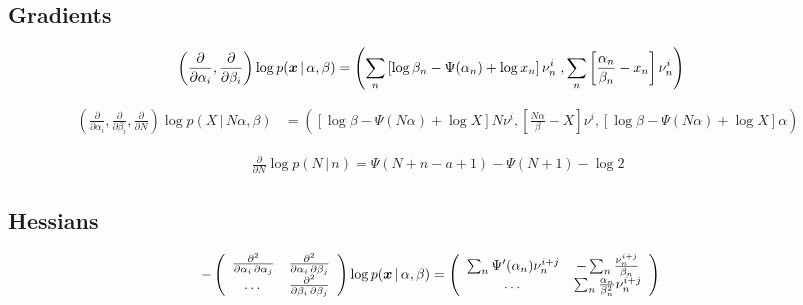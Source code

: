 \documentclass[11pt]{article}
\newcommand{\cond}{\,|\,}
\newcommand{\firstDeriv}[1]{\frac{\partial}{\partial #1}}
\newcommand{\secPartial}[2]{\frac{\partial^2}{\partial #1 \, \partial #2}} %
\begin{document}
\subsection{Gradients} \label{sec:gradients}

\begin{align}
  \label{eq:grad-posterior}
  \left( \firstDeriv{\alpha_i}, \firstDeriv{\beta_i} \right) \log p(\bmx \cond \alpha, \beta) &=
  \left(
    \sum_n \left[ \log \beta_n - \Psi(\alpha_n) + \log x_n \right] \nu_n^i \;,
    \sum_n \left[ \frac{\alpha_n}{\beta_n} - x_n \right]\nu_n^i
  \right)
\end{align}

\begin{align}
  \label{eq:grad-prediction}
  \left( \firstDeriv{\alpha_i}, \firstDeriv{\beta_i}, \firstDeriv{N} \right) \log p(X \cond N \alpha, \beta)  &=
  \left(
    \left[ \log \beta - \Psi(N \alpha) + \log X \right] N \nu^i,
    \left[ \frac{N\alpha}{\beta} - X \right]\nu^i,
    \left[ \log \beta -\Psi(N \alpha) + \log X \right] \alpha
  \right)
\end{align}

\begin{align}
  \label{eq:grad-nb}
  \firstDeriv{N} \log p(N \cond n) = \Psi(N+n-a+1) - \Psi(N+1) - \log 2
\end{align}

\subsection{Hessians} \label{sec:hessians}

\begin{align}
  \label{eq:hess-posterior}
    - \left(
    \begin{array}{ccc}
      \secPartial{\alpha_i}{\alpha_j} & \secPartial{\alpha_i}{\beta_j}\\
      \dots & \secPartial{\beta_i}{\beta_j}
    \end{array}
  \right) \log p(\bmx \cond \alpha, \beta)
    &= \left(
    \begin{array}{cc}
      \sum_n \Psi'(\alpha_n) \nu_n^{i+j} & -\sum_n \frac{\nu_n^{i+j}}{\beta_n}\\
      \dots & \sum_n \frac{\alpha_n}{\beta_n^2} \nu_n^{i+j}
    \end{array}
  \right)
\end{align}
\end{document}
